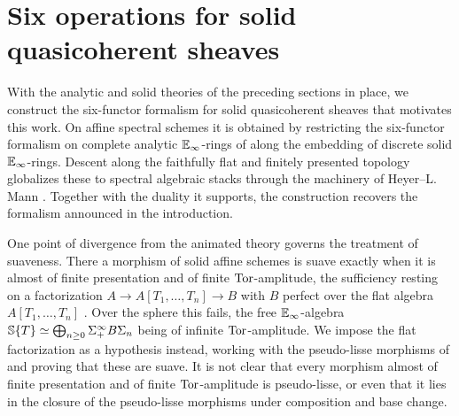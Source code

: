 \section{Six operations for solid quasicoherent sheaves}\label{sec: six functors for solid sheaves}
With the analytic and solid theories of the preceding sections in place, we construct the six-functor formalism for solid quasicoherent sheaves that motivates this work. On affine spectral schemes it is obtained by restricting the six-functor formalism on complete analytic $\mathbb{E}_{\infty}$-rings of  along the embedding of discrete solid $\mathbb{E}_{\infty}$-rings. Descent along the faithfully flat and finitely presented topology globalizes these to spectral algebraic stacks through the machinery of Heyer--L. Mann \cite[\S 3.4]{HeyerMann6FF}. Together with the duality it supports, the construction recovers the formalism announced in the introduction.

One point of divergence from the animated theory governs the treatment of suaveness. There a morphism of solid affine schemes is suave exactly when it is almost of finite presentation and of finite $\mathrm{Tor}$-amplitude, the sufficiency resting on a factorization $A\to A[T_{1},\dots,T_{n}]\to B$ with $B$ perfect over the flat algebra $A[T_{1},\dots,T_{n}]$ \cite[Lem. 2.7.12]{HansenMannCLL}. Over the sphere this fails, the free $\mathbb{E}_{\infty}$-algebra $\mathbb{S}\{T\}\simeq\bigoplus_{n\geq0}\Sigma^{\infty}_{+}B\Sigma_{n}$ being of infinite $\mathrm{Tor}$-amplitude. We impose the flat factorization as a hypothesis instead, working with the pseudo-lisse morphisms of  and proving that these are suave. It is not clear that every morphism almost of finite presentation and of finite $\mathrm{Tor}$-amplitude is pseudo-lisse, or even that it lies in the closure of the pseudo-lisse morphisms under composition and base change.
